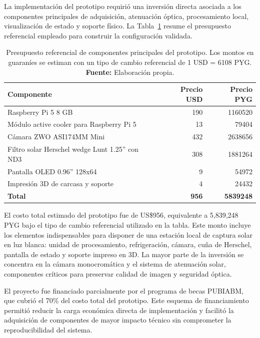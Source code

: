 La implementación del prototipo requirió una inversión directa asociada a los
componentes principales de adquisición, atenuación óptica, procesamiento local,
visualización de estado y soporte físico. La Tabla~\ref{tab:presupuesto-prototipo}
resume el presupuesto referencial empleado para construir la configuración
validada.

\begin{table}[H]
\centering
\caption{Presupuesto referencial de componentes principales del prototipo. Los montos en guaraníes se estiman con un tipo de cambio referencial de 1 USD = 6108 PYG. \textbf{Fuente:} Elaboración propia.}
\label{tab:presupuesto-prototipo}
\uniformtablestyle
\begin{tabularx}{\textwidth}{>{\raggedright\arraybackslash}X r r}
\toprule
\textbf{Componente} & \textbf{Precio USD} & \textbf{Precio PYG} \\
\midrule
Raspberry Pi 5 8 GB & 190 & 1160520 \\
Módulo active cooler para Raspberry Pi 5 & 13 & 79404 \\
Cámara ZWO ASI174MM Mini & 432 & 2638656 \\
Filtro solar Herschel wedge Lunt 1.25'' con ND3 & 308 & 1881264 \\
Pantalla OLED 0.96'' 128x64 & 9 & 54972 \\
Impresión 3D de carcasa y soporte & 4 & 24432 \\
\midrule
\textbf{Total} & \textbf{956} & \textbf{5839248} \\
\bottomrule
\end{tabularx}

\end{table}

El costo total estimado del prototipo fue de US\$956, equivalente a
5,839,248 PYG bajo el tipo de cambio referencial utilizado en la tabla. Este
monto incluye los elementos indispensables para disponer de una estación local de
captura solar en luz blanca: unidad de procesamiento, refrigeración, cámara,
cuña de Herschel, pantalla de estado y soporte impreso en 3D. La mayor parte de
la inversión se concentra en la cámara monocromática y el sistema de atenuación
solar, componentes críticos para preservar calidad de imagen y seguridad óptica.

El proyecto fue financiado parcialmente por el programa de becas PUBIABM, que
cubrió el 70\% del costo total del prototipo. Este esquema de financiamiento permitió reducir la carga económica
directa de implementación y facilitó la adquisición de componentes de mayor
impacto técnico sin comprometer la reproducibilidad del sistema.

